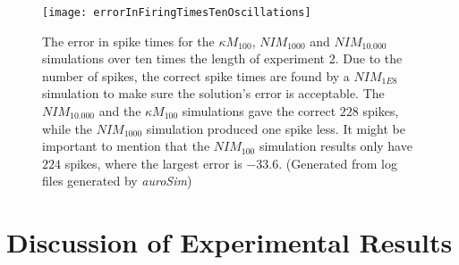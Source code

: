 \begin{figure}[hbt!p]
	\centering
	\centerline{ %
		\texttt{[image: errorInFiringTimesTenOscillations]}
	}
	\caption[Spike time error for all spikes from an extended run of experiment 2. The simulation time interval is ten times as long as the forcing function in experiment 2 to make the accumulation of error prominent.]{
			 	The error in spike times for the $\kappa M_{100}$, $NIM_{1000}$ and $NIM_{10.000}$  simulations over ten times the length of experiment 2. 
				Due to the number of spikes, the correct spike times are found by a $NIM_{1E8}$ simulation to make sure the solution's error is acceptable. %
				The $NIM_{10.000}$ and the $\kappa M_{100}$ simulations gave the correct $228$ spikes, 
					while the $NIM_{1000}$ simulation produced one spike less. %
				It might be important to mention that the $NIM_{100}$ simulation results only have $224$ spikes, 
					where the largest error is $-33.6$. %
				(Generated from log files generated by \emph{auroSim})
			}
	\label{figExperiment2ErrorInTenSineOscillations}
\end{figure}

	\section{Discussion of Experimental Results}


